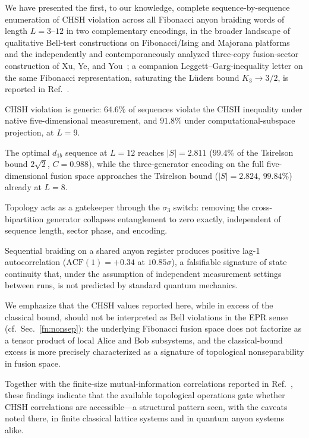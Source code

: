 \documentclass[aps,pra,twocolumn,superscriptaddress,longbibliography,floatfix,nofootinbib]{revtex4-2}
\begin{document}
We have presented the first, to our knowledge, complete sequence-by-sequence enumeration of CHSH
violation across all Fibonacci anyon braiding words of length $L=3$--$12$ in
two complementary encodings, in the broader landscape of qualitative
Bell-test constructions on Fibonacci/Ising and Majorana
platforms~\cite{Brennen2009,ChangChuMa2017,Drummond2014,RomitoGefen2017,ClarkeSauDasSarma2016}
and the independently and contemporaneously analyzed three-copy fusion-sector
construction of Xu, Ye, and You~\cite{Xu2025}; a companion
Leggett--Garg-inequality letter on the same Fibonacci representation,
saturating the L\"uders bound $K_3 \to 3/2$, is reported
in Ref.~\cite{Sayim2026LGI}.

CHSH violation is generic: $64.6\%$ of sequences violate the CHSH
inequality under native five-dimensional measurement, and $91.8\%$
under computational-subspace projection, at $L=9$.

The optimal $d_{1b}$ sequence at $L=12$ reaches $|S|=2.811$
($99.4\%$ of the Tsirelson bound $2\sqrt{2}$, $C=0.988$), while the
three-generator encoding on the full five-dimensional fusion space
approaches the Tsirelson bound ($|S|=2.824$, $99.84\%$) already at
$L=8$.

Topology acts as a gatekeeper through the $\sigma_3$ switch:
removing the cross-bipartition generator collapses entanglement
to zero exactly, independent of sequence length, sector phase,
and encoding.

Sequential braiding on a shared anyon register produces positive
lag-1 autocorrelation ($\text{ACF}(1)=+0.34$ at $10.85\sigma$),
a falsifiable signature of state continuity that, under the assumption
of independent measurement settings between runs, is not predicted by
standard quantum mechanics.

We emphasize that the CHSH values reported here, while in excess of the
classical bound, should not be interpreted as Bell violations in
the EPR sense (cf.\ Sec.~\ref{fn:nonsep}): the underlying Fibonacci
fusion space does not factorize as a tensor product of local Alice and
Bob subsystems, and the classical-bound excess is more precisely
characterized as a signature of topological nonseparability in
fusion space.

Together with the finite-size mutual-information correlations
reported in Ref.~\cite{Sayim2026topological}, these findings indicate
that the available topological operations gate whether CHSH
correlations are accessible---a structural pattern seen, with the
caveats noted there, in finite classical lattice systems and in
quantum anyon systems alike.
\end{document}

